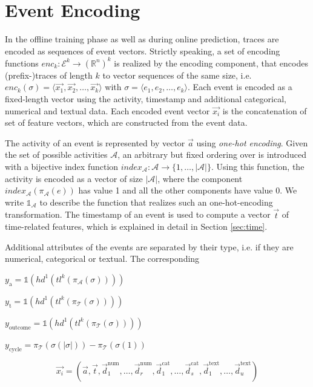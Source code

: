 \section{Event Encoding}

In the offline training phase as well as during online prediction, traces are encoded as sequences of event vectors.
Strictly speaking, a set of encoding functions  $enc_k \colon \mathcal{E}^k \to (\mathbb{R}^n)^k$ is realized by the encoding component, that encodes (prefix-)traces of length $k$ to vector sequences of the same size, i.e. $enc_k(\sigma) = \langle \vec{x_1}, \vec{x_2}, \dots, \vec{x_k}\rangle$ with $\sigma = \langle e_1, e_2, \dots, e_k\rangle$.
Each event is encoded as a fixed-length vector using the activity, timestamp and additional categorical, numerical and textual data.
Each encoded event vector $\vec{x_i}$ is the concatenation of set of feature vectors, which are constructed from the event data.

The activity of an event is represented by vector $\vec{a}$ using \textit{one-hot encoding}.
Given the set of possible activities $\mathcal{A}$, an arbitrary but fixed ordering over is introduced with a bijective index function $index_\mathcal{A} \colon \mathcal{A} \to \{1, \dots, |\mathcal{A}|\}$.
Using this function, the activity is encoded as a vector of size $|\mathcal{A}|$, where the component $index_\mathcal{A}(\pi_\mathcal{A}(e))$ has value 1 and all the other components have value 0.
We write $\mathds{1}_\mathcal{A}$ to describe the function that realizes such an one-hot-encoding transformation.
The timestamp of an event is used to compute a vector $\vec{t}$ of time-related features, which is explained in detail in Section \ref*{sec:time}.

Additional attributes of the events are separated by their type, i.e. if they are numerical, categorical or textual.
The corresponding 

$y_\mathrm{a} = \mathds{1}(hd^1(tl^k(\pi_\mathcal{A}(\sigma))))$

$y_\mathrm{t} = \mathds{1}(hd^1(tl^k(\pi_\mathcal{T}(\sigma))))$

$y_\mathrm{outcome} = \mathds{1}(hd^1(tl^k(\pi_\mathcal{T}(\sigma))))$

$y_\mathrm{cycle} =  \pi_\mathcal{T}(\sigma(|\sigma|))-  \pi_\mathcal{T}(\sigma(1))$

\begin{equation}
	\vec{x_i}=(
	\vec{a},
	\vec{t},
	\vec{d}_1^\mathrm{num}, \dots,\vec{d}_r^\mathrm{num},
	\vec{d}_1^\mathrm{cat}, \dots,\vec{d}_s^\mathrm{cat},
	\vec{d}_1^\mathrm{text}, \dots, \vec{d}_u^\mathrm{text})
\end{equation}


